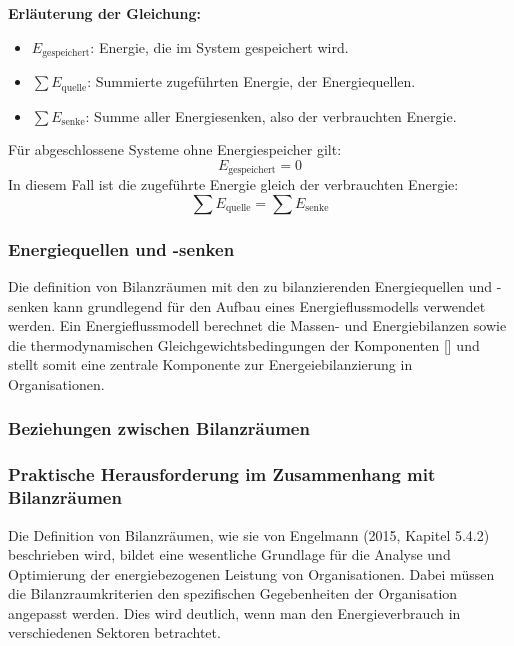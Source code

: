 \textbf{Erläuterung der Gleichung:}
\begin{itemize}
    \item \(E_{\text{gespeichert}}\): Energie, die im System gespeichert wird.
    \item \(\sum E_{\text{quelle}}\): Summierte zugeführten Energie, der Energiequellen.
    \item \(\sum E_{\text{senke}}\): Summe aller Energiesenken, also der verbrauchten Energie.
\end{itemize}

Für abgeschlossene Systeme ohne Energiespeicher  gilt:
\[
E_{\text{gespeichert}} = 0
\]
In diesem Fall ist die zugeführte Energie gleich der verbrauchten Energie:
\[
\sum E_{\text{quelle}} = \sum E_{\text{senke}}
\]



\subsubsection{Energiequellen und -senken}


Die definition von Bilanzräumen mit den zu bilanzierenden Energiequellen und -senken kann grundlegend für den Aufbau eines Energieflussmodells verwendet werden. 
Ein Energieflussmodell berechnet die Massen- und Energiebilanzen sowie die thermodynamischen Gleichgewichtsbedingungen der Komponenten [\cite{FrancescaPalazzi.2007}] und stellt somit eine zentrale Komponente 
zur Energeiebilanzierung in Organisationen.


\subsubsection{Beziehungen zwischen Bilanzräumen}


\subsubsection{Praktische Herausforderung im Zusammenhang mit Bilanzräumen}
Die Definition von Bilanzräumen, wie sie von Engelmann (2015, Kapitel 5.4.2) beschrieben wird, bildet eine wesentliche Grundlage für die Analyse und Optimierung der energiebezogenen Leistung von Organisationen. 
Dabei müssen die Bilanzraumkriterien den spezifischen Gegebenheiten der Organisation angepasst werden. Dies wird deutlich, wenn man den Energieverbrauch in verschiedenen Sektoren betrachtet.

